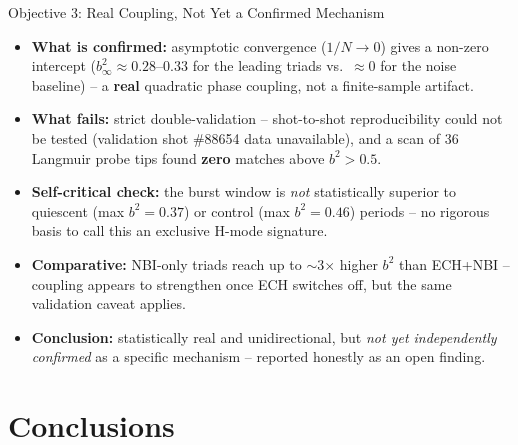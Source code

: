 \documentclass[aspectratio=169]{beamer}
\begin{document}
\begin{frame}{Objective 3: Real Coupling, Not Yet a Confirmed Mechanism}
    \footnotesize
    \begin{itemize}
        \item \textbf{What is confirmed:} asymptotic convergence ($1/N\to0$)
        gives a non-zero intercept ($b^2_\infty\approx0.28$--$0.33$ for the
        leading triads vs.\ $\approx0$ for the noise baseline) -- a
        \textbf{real} quadratic phase coupling, not a finite-sample artifact.
        \item \textbf{What fails:} strict double-validation --
        shot-to-shot reproducibility could not be tested (validation shot
        \#88654 data unavailable), and a scan of 36 Langmuir probe tips found
        \textbf{zero} matches above $b^2>0.5$.
        \item \textbf{Self-critical check:} the burst window is \emph{not}
        statistically superior to quiescent (max $b^2=0.37$) or control
        (max $b^2=0.46$) periods -- no rigorous basis to call this an
        exclusive H-mode signature.
        \item \textbf{Comparative:} NBI-only triads reach up to $\sim$3$\times$
        higher $b^2$ than ECH+NBI -- coupling appears to strengthen once ECH
        switches off, but the same validation caveat applies.
        \item \textbf{Conclusion:} statistically real and unidirectional, but
        \emph{not yet independently confirmed} as a specific mechanism --
        reported honestly as an open finding.
    \end{itemize}
\end{frame}

\section{Conclusions}
\end{document}
